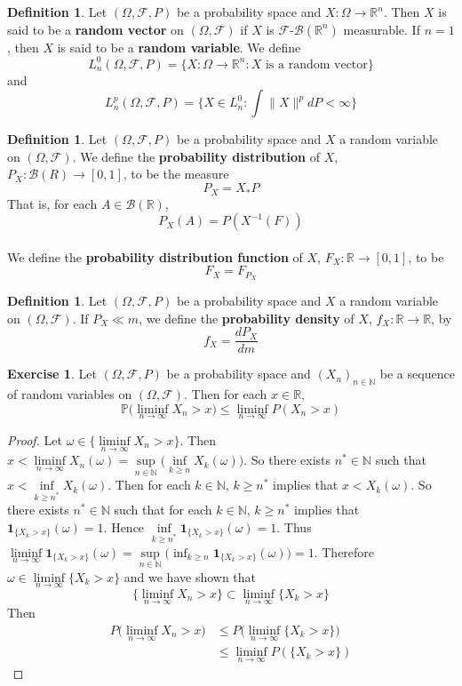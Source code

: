 \documentclass[12pt]{amsart}
\theoremstyle{definition}
\newtheorem{defn}[definition]{Definition}
\newtheorem{ex}[definition]{Exercise}
\newcommand{\om}{\omega}
\newcommand{\Om}{\Omega}
\newcommand{\N}{\mathbb{N}}
\newcommand{\R}{\mathbb{R}}
\renewcommand{\P}{\mathbb{P}}
\newcommand{\MB}{\mathcal{B}}
\newcommand{\MF}{\mathcal{F}}
\begin{document}
	\begin{defn}
		Let $(\Om, \MF, P)$ be a probability space and $X:\Om \rightarrow \R^n$. Then $X$ is said to be a \textbf{random vector} on $(\Om, \MF)$ if $X$ is $\MF$-$\MB(\R^n)$ measurable. If $n = 1$, then $X$ is said to be a \textbf{random variable}. We define $$L_n^0(\Om, \MF, P) = \{X:\Om \rightarrow \R^n: X \text{ is a random vector}\}$$ and $$L_n^p(\Om, \MF, P) = \bigg \{X \in L_n^0: \int \|X\|^p dP < \infty \bigg \} $$ 
	\end{defn}
	
	\begin{defn}
		Let $(\Om, \MF, P)$ be a probability space and $X$ a random variable on $(\Om,\MF)$. We define the \textbf{probability distribution} of $X$, $P_X:\MB(R) \rightarrow [0,1]$, to be the measure $$P_X = X_*P$$ That is, for each $A \in \MB(\R)$, $$P_X(A) = P(X^{-1}(F))$$ \\ We define the \textbf{probability distribution function} of $X$, $F_X:\R \rightarrow [0,1]$, to be $$F_X = F_{P_X}$$
	\end{defn}
	
	\begin{defn}
		Let $(\Om, \MF, P)$ be a probability space and $X$ a random variable on $(\Om,\MF)$. If $P_X \ll m$, we define the \textbf{probability density} of $X$, $f_X: \R \rightarrow \R$, by $$f_X = \frac{dP_X}{dm}$$ 
	\end{defn}
	
	\begin{ex}
		Let $(\Om, \MF, P)$ be a probability space and $(X_n)_{n \in \N}$ be a sequence of random variables on $(\Om, \MF)$. Then for each $x \in \R$, $$\P\bigg(\liminf_{n \rightarrow \infty}X_n > x\bigg) \leq \liminf_{n \rightarrow \infty} P(X_n > x)$$  
	\end{ex}
	
	\begin{proof}
		Let $\om \in \bigg \{ \liminf\limits_{n \rightarrow \infty} X_n > x \bigg \}$. Then $x< \liminf\limits_{n \rightarrow \infty} X_n (\om) = \sup\limits_{n \in \N} \bigg( \inf\limits_{k \geq n} X_k(\om)\bigg)$. So there exists $n^* \in \N$ such that $x< \inf\limits_{k \geq n^*} X_k(\om)$. Then for each $k \in \N$, $k \geq n^*$ implies that $x < X_k(\om)$. So there exists $n^* \in \N$ such that for each $k \in \N$, $k \geq n^*$ implies that $\mathbf{1}_{\{X_k > x\}}(\om) =1$. Hence $\inf\limits_{k \geq n^*} \mathbf{1}_{\{X_k > x\}}(\om)  = 1$. Thus  $\liminf\limits_{n \rightarrow \infty} \mathbf{1}_{\{X_k > x\}}(\om) = \sup\limits_{n \in \N} \bigg( \inf_{k \geq n} \mathbf{1}_{\{X_k > x\}}(\om) \bigg) = 1$. Therefore $\om \in \liminf\limits_{n \rightarrow \infty} \{X_k > x\}$ and we have shown that $$\bigg \{ \liminf\limits_{n \rightarrow \infty} X_n > x \bigg \} \subset \liminf\limits_{n \rightarrow \infty} \{X_k > x\}$$ Then 
		\begin{align*}
			P \bigg( \liminf\limits_{n \rightarrow \infty} X_n > x \bigg)
			& \leq P \bigg( \liminf\limits_{n \rightarrow \infty} \{X_k > x\} \bigg) \\
			& \leq \liminf_{n \rightarrow \infty} P(\{X_k > x\})
		\end{align*}
	\end{proof}
	
\end{document}
